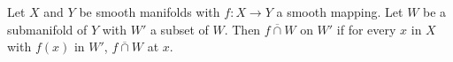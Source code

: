 Let $X$ and $Y$ be smooth manifolds with $f: X \to Y$ a smooth mapping. Let $W$ be a submanifold of $Y$ with $W'$ a subset of $W$. Then $f \mathrel{\overline{\cap}} W$ on $W'$ if for every $x$ in $X$ with $f(x)$ in $W'$, $f \mathrel{\overline{\cap}} W$ at $x$.
